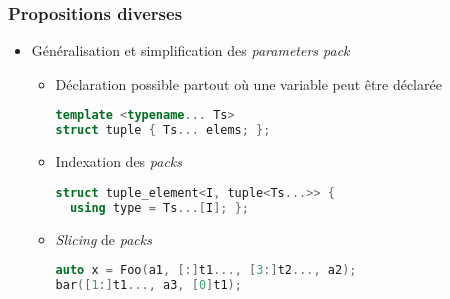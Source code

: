 \documentclass[C++.tex]{subfiles}
\begin{document}
\begin{frame}[fragile]
	\frametitle{Propositions diverses}
	\begin{itemize}
		\item Généralisation et simplification des \textit{parameters pack}
		\begin{itemize}
			\item Déclaration possible partout où une variable peut être déclarée

			\begin{lstlisting}[language=C++]
template <typename... Ts>
struct tuple { Ts... elems; };\end{lstlisting}

			\item Indexation des \textit{packs}

			\begin{lstlisting}[language=C++]
struct tuple_element<I, tuple<Ts...>> {
  using type = Ts...[I]; };\end{lstlisting}

			\item \textit{Slicing} de \textit{packs}

			\begin{lstlisting}[language=C++]
auto x = Foo(a1, [:]t1..., [3:]t2..., a2);
bar([1:]t1..., a3, [0]t1);\end{lstlisting}

		\end{itemize}
	\end{itemize}
\end{frame}
\end{document}
